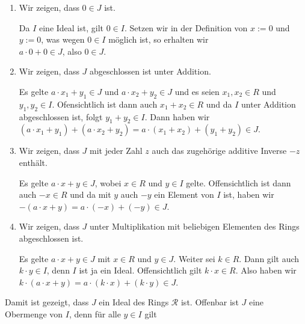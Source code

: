 \begin{enumerate}
\item Wir zeigen, dass $0 \in J$ ist.
 
      Da $I$ eine Ideal ist, gilt $0 \in I$.  Setzen wir in der Definition von
      $x := 0$ und $y := 0$, was wegen $0 \in I$ möglich ist, so erhalten wir
      \\[0.2cm]
      \hspace*{1.3cm}
      $a \cdot 0 + 0 \in J$, \quad also \quad $0 \in J$.
      \checkmark
\item Wir zeigen, dass $J$ abgeschlossen ist unter Addition.

      Es gelte $a \cdot x_1 + y_1 \in J$ und $a \cdot x_2 + y_2 \in J$ und es seien
      $x_1,x_2 \in R$ und $y_1,y_2 \in I$.  Ofensichtlich ist dann auch $x_1 + x_2 \in R$ und
      da $I$ unter Addition abgeschlossen ist, folgt $y_1 + y_2 \in I$.  Dann haben wir
      \\[0.2cm]
      \hspace*{1.3cm}
      $(a \cdot x_1 + y_1) + (a \cdot x_2 + y_2) = a \cdot (x_1 + x_2) + (y_1 + y_2) \in J$.
      \checkmark
\item Wir zeigen, dass $J$ mit jeder Zahl $z$ auch das zugehörige additive Inverse $-z$ enthält.

      Es gelte $a \cdot x + y \in J$, wobei
      $x \in R$ und $y \in I$ gelte.  Offensichtlich ist dann auch $-x \in R$ und
      da mit $y$ auch $-y$ ein Element von $I$ ist, haben wir
      \\[0.2cm]
      \hspace*{1.3cm}
      $-(a \cdot x + y) = a \cdot (-x) + (-y) \in J$.
      \checkmark
\item Wir zeigen, dass $J$ unter Multiplikation mit beliebigen Elementen des Rings abgeschlossen ist.

      Es gelte $a \cdot x + y \in J$ mit $x \in R$ und $y \in J$.  Weiter sei $k \in R$.
      Dann gilt auch $k \cdot y \in I$, denn $I$ ist ja ein Ideal. Offensichtlich gilt $k \cdot x \in R$.
      Also haben wir
      \\[0.2cm]
      \hspace*{1.3cm}
      $k \cdot (a \cdot x + y) = a \cdot (k \cdot x) + (k \cdot y) \in J$.
      \checkmark
\end{enumerate}
Damit ist gezeigt, dass $J$ ein Ideal des Rings $\mathcal{R}$ ist.
Offenbar ist $J$ eine Obermenge von $I$, denn für alle $y \in I$ gilt
\\[0.2cm]
\hspace*{1.3cm}
